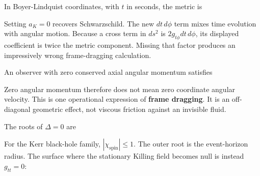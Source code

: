 \documentclass[
  11pt,
  letterpaper,
  oneside,
  openany]{scrbook}
\begin{document}
In Boyer-Lindquist coordinates, with \(t\) in seconds, the metric is

\begin{center}
\begingroup
{}
\ifdim\wd\grmathbox>\linewidth
\resizebox{\linewidth}{!}{\usebox{\grmathbox}}
\else\usebox{\grmathbox}\fi
\endgroup
\end{center}

Setting \(a_K=0\) recovers Schwarzschild. The new \(dt\,d\phi\) term
mixes time evolution with angular motion. Because a cross term in
\(ds^2\) is \(2g_{t\phi}dt\,d\phi\), its displayed coefficient is twice
the metric component. Missing that factor produces an impressively wrong
frame-dragging calculation.

An observer with zero conserved axial angular momentum satisfies

\begin{center}
\begingroup
{}
\ifdim\wd\grmathbox>\linewidth
\resizebox{\linewidth}{!}{\usebox{\grmathbox}}
\else\usebox{\grmathbox}\fi
\endgroup
\end{center}

Zero angular momentum therefore does not mean zero coordinate angular
velocity. This is one operational expression of \textbf{frame dragging}.
It is an off-diagonal geometric effect, not viscous friction against an
invisible fluid.

The roots of \(\Delta=0\) are

\begin{center}
\begingroup
{}
\ifdim\wd\grmathbox>\linewidth
\resizebox{\linewidth}{!}{\usebox{\grmathbox}}
\else\usebox{\grmathbox}\fi
\endgroup
\end{center}

For the Kerr black-hole family, \(|\chi_{\mathrm{spin}}|\le1\). The
outer root is the event-horizon radius. The surface where the stationary
Killing field becomes null is instead \(g_{tt}=0\):
\end{document}
